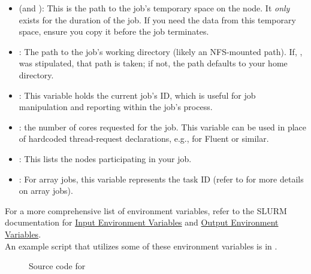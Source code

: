 \documentclass{easychair}
\begin{document}
\begin{itemize}
	\item
	 (and ):
	This is the path to the job's temporary space on the node. It \emph{only} exists for the duration of the job.
	If you need the data from this temporary space, ensure you copy it before the job terminates.

	\item
	:
	The path to the job's working directory (likely an NFS-mounted path).
	If, , was stipulated, that path is taken; if not, 
	the path defaults to your home directory.
	
	\item
	:
	This variable holds the current job's ID, which is useful for job
	manipulation and reporting within the job's process.

	\item
	: the number of cores requested for the job. This variable can 
	be used in place of hardcoded thread-request declarations, e.g., for
	Fluent or similar.

	\item
	:
	This lists the nodes participating in your job.

	\item {}:
	For array jobs, this variable represents the task ID 
	(refer to  for more details on array jobs).
\end{itemize}

\noindent
For a more comprehensive list of environment variables, refer to the SLURM documentation for 
\href{https://slurm.schedmd.com/srun.html#SECTION_INPUT-ENVIRONMENT-VARIABLES}{Input Environment Variables} and
\href{https://slurm.schedmd.com/srun.html#SECTION_OUTPUT-ENVIRONMENT-VARIABLES}{Output Environment Variables}.\\

\noindent
An example script that utilizes some of these environment variables
is in .

\begin{figure}[htpb]
    
    \caption{Source code for }
	\label{fig:tmpdir.sh}
\end{figure}

\end{document}
